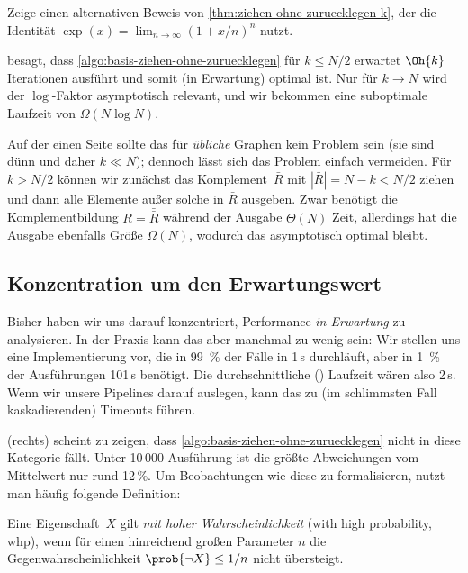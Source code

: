 \begin{exercise}
    Zeige einen alternativen Beweis von \cref{thm:ziehen-ohne-zuruecklegen-k}, der die Identität $\exp(x) = \lim_{n \to \infty} (1 + x/n)^n$ nutzt.
\end{exercise}

\bigskip

 besagt, dass \cref{algo:basis-ziehen-ohne-zuruecklegen} für $k \le N / 2$ erwartet $\Oh{k}$ Iterationen ausführt und somit (in Erwartung) optimal ist.
Nur für $k \to N$ wird der $\log$-Faktor asymptotisch relevant, und wir bekommen eine suboptimale Laufzeit von $\Omega(N \log N)$.

Auf  der einen Seite sollte das für \emph{übliche} Graphen kein Problem sein (sie sind dünn und daher $k \ll N$); dennoch lässt sich das Problem einfach vermeiden.
Für $k > N / 2$ können wir zunächst das Komplement~$\bar R$ mit  $| \bar R | = N - k < N/2$ ziehen und dann alle Elemente außer solche in $\bar R$ ausgeben.
Zwar benötigt die Komplementbildung $R = \bar{\bar R}$ während der Ausgabe $\Theta(N)$ Zeit, allerdings hat die Ausgabe ebenfalls Größe $\Omega(N)$, wodurch das asymptotisch optimal bleibt.

\subsection{Konzentration um den Erwartungswert}
Bisher haben wir uns darauf konzentriert, Performance \emph{in Erwartung} zu analysieren.
In der Praxis kann das aber manchmal zu wenig sein:
Wir stellen uns eine Implementierung vor, die in 99~\% der Fälle in 1\,s durchläuft, aber in 1~\% der Ausführungen 101\,s benötigt.
Die durchschnittliche () Laufzeit wären also 2\,s.
Wenn wir unsere Pipelines darauf auslegen, kann das zu (im schlimmsten Fall kaskadierenden) Timeouts führen.

 (rechts) scheint zu zeigen, dass \cref{algo:basis-ziehen-ohne-zuruecklegen} nicht in diese Kategorie fällt.
Unter 10\,000 Ausführung ist die größte Abweichungen vom Mittelwert nur rund 12\,\%.
Um Beobachtungen wie diese zu formalisieren, nutzt man häufig folgende Definition:

\begin{definition}
    Eine  Eigenschaft~$X$ gilt \emph{mit hoher Wahrscheinlichkeit} (with high probability, whp),
    wenn für einen hinreichend großen Parameter $n$ die Gegenwahrscheinlichkeit $\prob{\lnot X} \le 1/n$ nicht übersteigt.
\end{definition}

